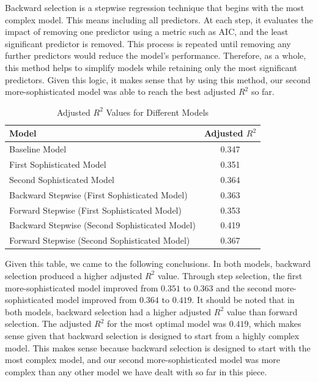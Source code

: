 \documentclass{article}
\begin{document}
\bigskip
\bigskip

Backward selection is a stepwise regression technique that begins with the most complex model. This means including all predictors. At each step, it evaluates the impact of removing one predictor using a metric such as AIC, and the least significant predictor is removed. This process is repeated until removing any further predictors would reduce the model's performance. Therefore, as a whole, this method helps to simplify models while retaining only the most significant predictors. Given this logic, it makes sense that by using this method, our second more-sophisticated model was able to reach the best adjusted $R^2$ so far.\\

\begin{table}[h!]
\centering
\caption{Adjusted \(R^2\) Values for Different Models}
\label{tab:adjusted-r2-models}
\begin{tabular}{|l|c|}
\hline
\textbf{Model}                                                   & \textbf{Adjusted \(R^2\)} \\ \hline
Baseline Model                                                   & 0.347                     \\ \hline
First Sophisticated Model                                        & 0.351                     \\ \hline
Second Sophisticated Model                                               & 0.364                     \\ \hline
Backward Stepwise (First Sophisticated Model)                   & 0.363                     \\ \hline
Forward Stepwise (First Sophisticated Model)                    & 0.353    \\ \hline
Backward Stepwise (Second Sophisticated Model)                   & 0.419                     \\ \hline
Forward Stepwise (Second Sophisticated  Model)                    & 0.367    
    \\ \hline

\end{tabular}
\end{table}

\bigskip

Given this table, we came to the following conclusions. In both models, backward selection produced a higher adjusted $R^2$ value. Through step selection, the first more-sophisticated model improved from $0.351$ to $0.363$ and the second more-sophisticated model improved from $0.364$ to $0.419$. It should be noted that in both models, backward selection had a higher adjusted $R^2$ value than forward selection. The adjusted $R^2$ for the most optimal model was $0.419$, which makes sense given that backward selection is designed to start from a highly complex model. This makes sense because backward selection is designed to start with the most complex model, and our second more-sophisticated model was more complex than any other model we have dealt with so far in this piece. \\
\end{document}
